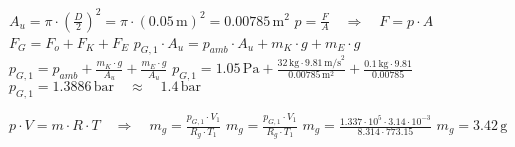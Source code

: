 \( A_u = \pi \cdot \left( \frac{D}{2} \right)^2 = \pi \cdot (0.05 \, \text{m})^2 = 0.00785 \, \text{m}^2 \)  
\( p = \frac{F}{A} \quad \Rightarrow \quad F = p \cdot A \)  
\( F_{G} = F_{o} + F_{K} + F_{E} \)  
\( p_{G,1} \cdot A_u = p_{amb} \cdot A_u + m_K \cdot g + m_E \cdot g \)  
\( p_{G,1} = p_{amb} + \frac{m_K \cdot g}{A_u} + \frac{m_E \cdot g}{A_u} \)  
\( p_{G,1} = 1.05 \, \text{Pa} + \frac{32 \, \text{kg} \cdot 9.81 \, \text{m/s}^2}{0.00785 \, \text{m}^2} + \frac{0.1 \, \text{kg} \cdot 9.81}{0.00785} \)  
\( p_{G,1} = 1.3886 \, \text{bar} \quad \approx \quad 1.4 \, \text{bar} \)  

\( p \cdot V = m \cdot R \cdot T \quad \Rightarrow \quad m_g = \frac{p_{G,1} \cdot V_1}{R_g \cdot T_1} \)  
\( m_g = \frac{p_{G,1} \cdot V_1}{R_g \cdot T_1} \)  
\( m_g = \frac{1.337 \cdot 10^5 \cdot 3.14 \cdot 10^{-3}}{8.314 \cdot 773.15} \)  
\( m_g = 3.42 \, \text{g} \)